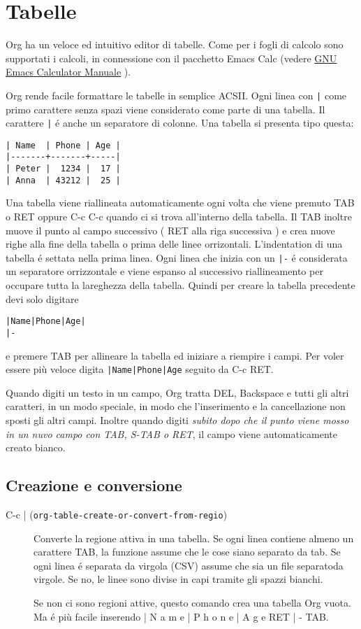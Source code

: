 \documentclass[11pt]{article}
\begin{document}
\section{Tabelle}
\label{sec:org08f7d33}
Org ha un veloce ed intuitivo editor di tabelle. Come per i fogli di
calcolo sono supportati i calcoli, in connessione con il pacchetto
Emacs Calc (vedere \href{https://www.gnu.org/software/emacs/manual/html\_mono/calc.html\#Top}{GNU Emacs Calculator Manuale} ).

Org rende facile formattare le tabelle in semplice ACSII. Ogni linea
con \texttt{|} come primo carattere senza spazi viene considerato come parte
di una tabella. Il carattere \texttt{|} é anche un separatore di colonne. Una
tabella si presenta tipo questa:

\begin{verbatim}
| Name  | Phone | Age |
|-------+-------+-----|
| Peter |  1234 |  17 |
| Anna  | 43212 |  25 |
\end{verbatim}

Una tabella viene riallineata automaticamente ogni volta che viene
premuto TAB o RET oppure C-c C-c
quando ci si trova all'interno della tabella. Il TAB
inoltre muove il punto al campo successivo ( RET alla riga
successiva ) e crea nuove righe alla fine della tabella o prima delle
linee orrizontali. L'indentation di una tabella é settata nella prima
linea. Ogni linea che inizia con un \texttt{|-} é considerata un separatore
orrizzontale e viene espanso al successivo riallineamento per occupare
tutta la lareghezza della tabella. Quindi per creare la tabella
precedente devi solo digitare

\begin{verbatim}
|Name|Phone|Age|
|-
\end{verbatim}


e premere TAB per allineare la tabella ed iniziare a
riempire i campi. Per voler essere più veloce digita \texttt{|Name|Phone|Age}
seguito da C-c RET.

Quando digiti un testo in un campo, Org tratta DEL,
Backspace e tutti gli altri caratteri, in un modo speciale,
in modo che l'inserimento e la cancellazione non sposti gli altri
campi. Inoltre quando digiti \emph{subito dopo che il punto viene mosso in
un nuvo campo con TAB, S-TAB o RET},
il campo viene automaticamente creato bianco.

\subsection*{Creazione e conversione}
\label{sec:org30163b6}
\begin{description}
\item[{C-c | (\texttt{org-table-create-or-convert-from-regio})}] Converte la regione attiva in una tabella. Se ogni linea contiene
almeno un carattere TAB, la funzione assume che le cose
siano separato da tab. Se ogni linea é separata da virgola (CSV)
assume che sia un file separatoda virgole. Se no, le linee sono
divise in capi tramite gli spazzi bianchi.

Se non ci sono regioni attive, questo comando crea una tabella Org
vuota. Ma é più facile inserendo | N a m e | P h o n e | A g e RET | - TAB.
\end{description}
\end{document}
